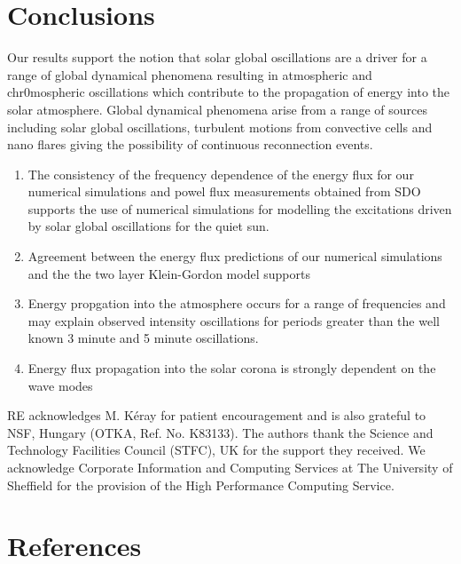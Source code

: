 \documentclass[final,1p]{elsarticle}
\begin{document}



\section{Conclusions}

Our results support the notion that solar global oscillations are a driver for a range of global dynamical phenomena resulting in atmospheric and chr0mospheric oscillations which contribute to the propagation of energy into the solar atmosphere.  Global dynamical phenomena arise from a range of sources including solar global oscillations, turbulent motions from convective cells and nano flares giving the possibility of continuous reconnection events.
   \begin{enumerate}
      \item The  consistency of the frequency dependence of the energy flux for our numerical simulations and powel flux measurements obtained from SDO supports the use of numerical simulations for modelling the excitations driven by solar global oscillations for the quiet sun.
      \item Agreement between the energy flux predictions of our numerical simulations and the the two layer Klein-Gordon model supports
      \item Energy propgation into the atmosphere occurs for a range of frequencies and may explain observed intensity oscillations for periods greater than the well known 3 minute and 5 minute oscillations.  
      \item Energy flux propagation into the solar corona is strongly dependent on the wave modes
   \end{enumerate}

\begin{acknowledgements}
RE acknowledges M. K\'eray for patient encouragement and is also grateful to NSF, Hungary (OTKA, Ref. No. K83133). 
The authors thank the Science and Technology Facilities Council (STFC), UK for the support they received. We acknowledge Corporate Information and Computing Services at The University of Sheffield for the provision of the High Performance Computing Service.
\end{acknowledgements}


\section{References}

%

\end{document}
